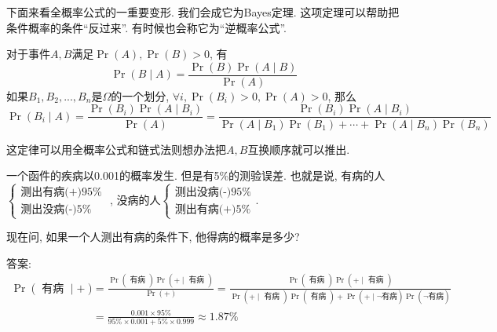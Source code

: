 \documentclass{ctexart}
\begin{document}
下面来看全概率公式的一重要变形. 我们会成它为Bayes定理. 这项定理可以帮助把条件概率的条件``反过来''. 有时候也会称它为``逆概率公式''. 

\begin{theorem}
    对于事件$A,B$满足$\Pr(A), \Pr(B)>0$, 有
    $$
\operatorname{Pr}(B \mid A)=\frac{\operatorname{Pr}(B) \operatorname{Pr}(A \mid B)}{\operatorname{Pr}(A)}
$$
如果$B_1,B_2, ..., B_n$是$\Omega$的一个划分, $\forall i,\Pr(B_i)>0, \Pr(A)>0$, 那么
$$
\operatorname{Pr}\left(B_i \mid A\right)=\frac{\operatorname{Pr}\left(B_i\right) \operatorname{Pr}\left(A \mid B_i\right)}{\operatorname{Pr}(A)}=\frac{\operatorname{Pr}\left(B_i\right) \operatorname{Pr}\left(A \mid B_i\right)}{\operatorname{Pr}\left(A \mid B_1\right) \operatorname{Pr}\left(B_1\right)+\cdots+\operatorname{Pr}\left(A \mid B_n\right) \operatorname{Pr}\left(B_n\right)}
$$
\end{theorem}

这定律可以用全概率公式和链式法则想办法把$A,B$互换顺序就可以推出. 

\begin{example}[假阳性问题]
    一个函件的疾病以0.001的概率发生. 但是有5\%的测验误差. 也就是说, 有病的人
    $\begin{cases}
\text{测出有病(+)}95 \% \\
\text{测出没病(-)}5 \%
\end{cases}$
, 没病的人$
\begin{cases}
\text{测出没病(-)}95 \% \\
\text{测出有病(+)}5 \%
\end{cases}$.

现在问, 如果一个人测出有病的条件下, 他得病的概率是多少?

答案: 
$$
\begin{aligned}
    \operatorname{Pr}(\text { 有病 } \mid+) & =\frac{\operatorname{Pr}(\text { 有病 }) \operatorname{Pr}(+\mid \text { 有病 })}{\operatorname{Pr}(+)}=\frac{\operatorname{Pr}(\text { 有病 }) \operatorname{Pr}(+\mid \text { 有病 })}{\operatorname{Pr}(+\mid \text { 有病 }) \operatorname{Pr}(\text { 有病 })+\operatorname{Pr}(+\mid \neg \text{有病}) \operatorname{Pr}(\neg \text{有病})} \\
& =\frac{0.001 \times 95 \%}{95 \% \times 0.001+5 \% \times 0.999} \approx 1.87 \%
\end{aligned}
$$
\end{example}
\end{document}
